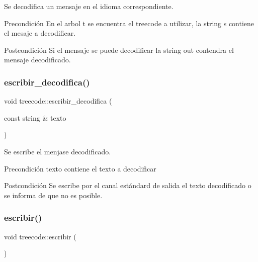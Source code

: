 Se decodifica un mensaje en el idioma correspondiente. 

\begin{DoxyPrecond}{Precondición}
En el arbol t se encuentra el treecode a utilizar, la string s contiene el mesaje a decodificar. 
\end{DoxyPrecond}
\begin{DoxyPostcond}{Postcondición}
Si el mensaje se puede decodificar la string out contendra el mensaje decodificado. 
\end{DoxyPostcond}
\mbox{\label{classtreecode_aa009979ff4cb55efdf3a73c969e71291}} 
\subsubsection{\texorpdfstring{escribir\+\_\+decodifica()}{escribir\_decodifica()}}
{\footnotesize\ttfamily void treecode\+::escribir\+\_\+decodifica (\begin{DoxyParamCaption}\item[{const string \&}]{texto }\end{DoxyParamCaption})}



Se escribe el menjase decodificado. 

\begin{DoxyPrecond}{Precondición}
texto contiene el texto a decodificar 
\end{DoxyPrecond}
\begin{DoxyPostcond}{Postcondición}
Se escribe por el canal estándard de salida el texto decodificado o se informa de que no es posible. 
\end{DoxyPostcond}
\mbox{\label{classtreecode_a1b4221231711dc52751ddca683f146b1}} 
\subsubsection{\texorpdfstring{escribir()}{escribir()}}
{\footnotesize\ttfamily void treecode\+::escribir (\begin{DoxyParamCaption}{ }\end{DoxyParamCaption})}



